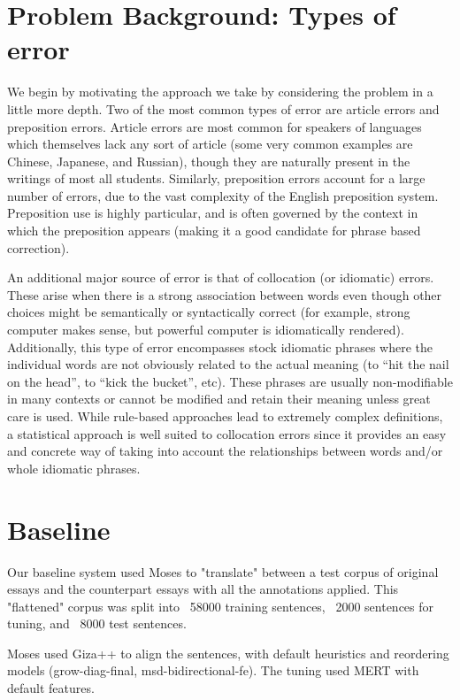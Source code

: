 \documentclass[11pt,letterpaper]{article}
\begin{document}
\section{Problem Background: Types of error}
\indent We begin by motivating the approach we take by considering the problem in a little more depth. Two of the most common types of error are article errors and preposition errors. 
Article errors are most common for speakers of languages which themselves lack any sort of article 
(some very common examples are Chinese, Japanese, and Russian), though they are naturally present 
in the writings of most all students. Similarly, preposition errors account for a large number of 
errors, due to the vast complexity of the English preposition system. Preposition use is highly particular, 
and is often governed by the context in which the preposition appears (making it a good candidate for 
phrase based correction). \newline

\indent An additional major source of error is that of collocation (or idiomatic) errors. These 
arise when there is a strong association between words even though other choices might be semantically 
or syntactically correct (for example, strong computer makes sense, but powerful computer is idiomatically 
rendered). Additionally, this type of error encompasses stock idiomatic phrases where the individual words 
are not obviously related to the actual meaning (to “hit the nail on the head”, to “kick the bucket”, etc). 
These phrases are usually non-modifiable in many contexts or cannot be modified and retain their meaning 
unless great care is used. While rule-based approaches lead to extremely complex definitions, a 
statistical approach is well suited to collocation errors since it provides an easy and concrete way 
of taking into account the relationships between words and/or whole idiomatic phrases. \newline

\section{Baseline}
Our baseline system used Moses to "translate" between a test corpus of original essays and the counterpart essays with all the annotations applied. This "flattened" corpus was split into ~58000 training sentences, ~2000 sentences for tuning, and ~8000 test sentences. 

Moses used Giza++ to align the sentences, with default heuristics and reordering models (grow-diag-final, msd-bidirectional-fe). The tuning used MERT with default features. 
\end{document}
